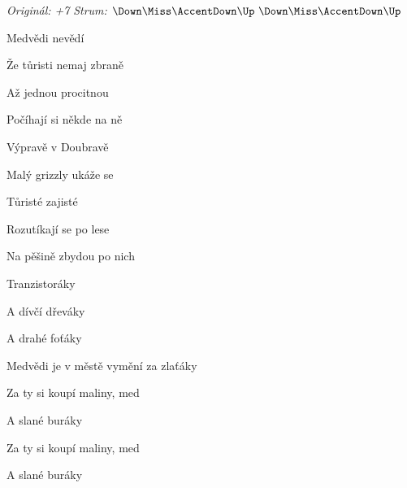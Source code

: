 \begin{song}


\begin{headerbox}
\RaiseBoxWithAccents
\textit{Originál: +7} \quad
\textit{Strum:} $\Down\Miss\AccentDown\Up\ \Down\Miss\AccentDown\Up$
\end{headerbox}

\begin{hchordbox}
\end{hchordbox}

\Large

\bigskip

Medvědi nevědí \par
{}Že tůristi nemaj zbraně \par
{}Až jednou procitnou \par
{}Počíhají si někde na ně \par

\bigskip

Výpravě v Doubravě \par
{}Malý grizzly ukáže se \par
{}Tůristé zajisté \par
{}Rozutíkají se po lese \par

\bigskip

Na pěšině zbydou po nich \par
{}Tranzistoráky  \par
A dívčí dřeváky  \par
A drahé foťáky  \par

\bigskip

Medvědi je v městě vymění za zlaťáky \par
{}Za ty si koupí maliny, med  \par
A slané buráky  \par
{}Za ty si koupí maliny, med  \par
A slané buráky \par

\bigskip


\end{song}
